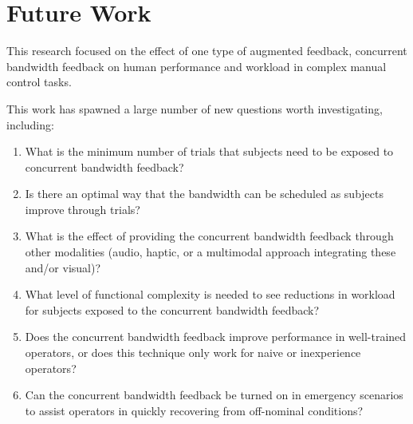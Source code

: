 \section{Future Work}

This research focused on the effect of one type of augmented feedback, concurrent bandwidth feedback on human performance and workload in complex manual control tasks.

This work has spawned a large number of new questions worth investigating, including:
\begin{enumerate}
    \item What is the minimum number of trials that subjects need to be exposed to concurrent bandwidth feedback?
    \item Is there an optimal way that the bandwidth can be scheduled as subjects improve through trials?
    \item What is the effect of providing the concurrent bandwidth feedback through other modalities (audio, haptic, or a multimodal approach integrating these and/or visual)?
    \item What level of functional complexity is needed to see reductions in workload for subjects exposed to the concurrent bandwidth feedback?
    \item Does the concurrent bandwidth feedback improve performance in well-trained operators, or does this technique only work for naive or inexperience operators?
    \item Can the concurrent bandwidth feedback be turned on in emergency scenarios to assist operators in quickly recovering from off-nominal conditions?
\end{enumerate}

